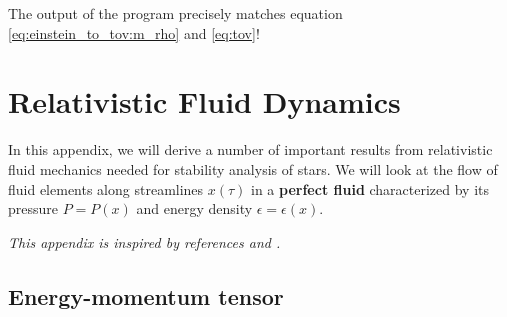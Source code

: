 
The output of the program precisely matches equation \eqref{eq:einstein_to_tov:m_rho} and \eqref{eq:tov}!


\chapter{Relativistic Fluid Dynamics}
\label{chap:relfluid}

In this appendix, we will derive a number of important results from relativistic fluid mechanics needed for stability analysis of stars.
We will look at the flow of fluid elements along streamlines $x(\tau)$ in a \textbf{perfect fluid} characterized by its pressure $P = P(x)$ and energy density $\epsilon = \epsilon(x)$.

\textit{This appendix is inspired by references \cite{ref:mtw} and \cite{ref:weinberg_gravity}.}

\section{Energy-momentum tensor}

